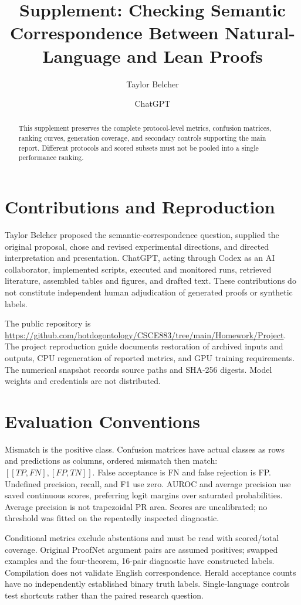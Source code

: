 \documentclass[manuscript,nonacm]{acmart}
\title{Supplement: Checking Semantic Correspondence Between Natural-Language and Lean Proofs}
\author{Taylor Belcher}
\author{ChatGPT}
\begin{document}
\begin{abstract}
This supplement preserves the complete protocol-level metrics, confusion matrices, ranking curves, generation coverage, and secondary controls supporting the main report. Different protocols and scored subsets must not be pooled into a single performance ranking.
\end{abstract}
\maketitle
\section{Contributions and Reproduction}
Taylor Belcher proposed the semantic-correspondence question, supplied the original proposal, chose and revised experimental directions, and directed interpretation and presentation. ChatGPT, acting through Codex as an AI collaborator, implemented scripts, executed and monitored runs, retrieved literature, assembled tables and figures, and drafted text. These contributions do not constitute independent human adjudication of generated proofs or synthetic labels.

The public repository is \url{https://github.com/hotdogontology/CSCE883/tree/main/Homework/Project}. The project reproduction guide documents restoration of archived inputs and outputs, CPU regeneration of reported metrics, and GPU training requirements. The numerical snapshot records source paths and SHA-256 digests. Model weights and credentials are not distributed.

\section{Evaluation Conventions}
Mismatch is the positive class. Confusion matrices have actual classes as rows and predictions as columns, ordered mismatch then match: $[[TP,FN],[FP,TN]]$. False acceptance is FN and false rejection is FP. Undefined precision, recall, and F1 use zero. AUROC and average precision use saved continuous scores, preferring logit margins over saturated probabilities. Average precision is not trapezoidal PR area. Scores are uncalibrated; no threshold was fitted on the repeatedly inspected diagnostic.

Conditional metrics exclude abstentions and must be read with scored/total coverage. Original ProofNet argument pairs are assumed positives; swapped examples and the four-theorem, 16-pair diagnostic have constructed labels. Compilation does not validate English correspondence. Herald acceptance counts have no independently established binary truth labels. Single-language controls test shortcuts rather than the paired research question.
\end{document}
